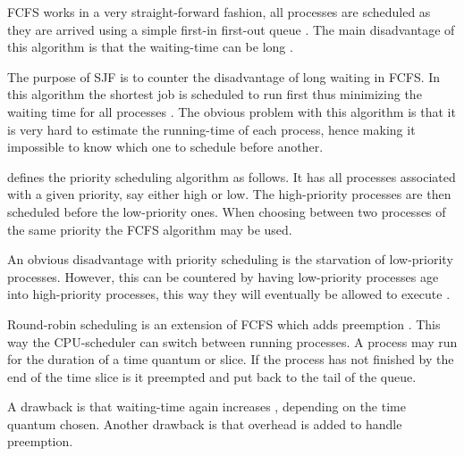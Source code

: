 \documentclass[a4paper,nocourse]{miunasgn}
\begin{document}
\begin{questions}
	\begin{solution}
		FCFS works in a very straight-forward fashion, all processes are scheduled 
		as they are arrived using a simple first-in first-out queue \citep[p.  
		188]{Silberschatz2009osc}.
		The main disadvantage of this algorithm is that the waiting-time can be 
		long \citep[see][bottom p. 188]{Silberschatz2009osc}.

		The purpose of SJF is to counter the disadvantage of long waiting in FCFS.
		In this algorithm the shortest job is scheduled to run first thus 
		minimizing the waiting time for all processes \citep[p.  
		190]{Silberschatz2009osc}.
		The obvious problem with this algorithm is that it is very hard to estimate 
		the running-time of each process, hence making it impossible to know which 
		one to schedule before another.

		\citet[p. 192]{Silberschatz2009osc} defines the priority scheduling 
		algorithm as follows.
		It has all processes associated with a given priority, say either high or 
		low.
		The high-priority processes are then scheduled before the low-priority 
		ones.
		When choosing between two processes of the same priority the FCFS algorithm 
		may be used.

		An obvious disadvantage with priority scheduling is the starvation of 
		low-priority processes.
		However, this can be countered by having low-priority processes age into 
		high-priority processes, this way they will eventually be allowed to 
		execute \citep[p. 193]{Silberschatz2009osc}.

		Round-robin scheduling is an extension of FCFS which adds preemption 
		\citep[p. 194]{Silberschatz2009osc}.
		This way the CPU-scheduler can switch between running processes.
		A process may run for the duration of a time quantum or slice.
		If the process has not finished by the end of the time slice is it 
		preempted and put back to the tail of the queue.

		A drawback is that waiting-time again increases \citep[p.  
		192]{Silberschatz2009osc}, depending on the time quantum chosen.
		Another drawback is that overhead is added to handle preemption.


\end{solution}
\end{questions}
\end{document}
